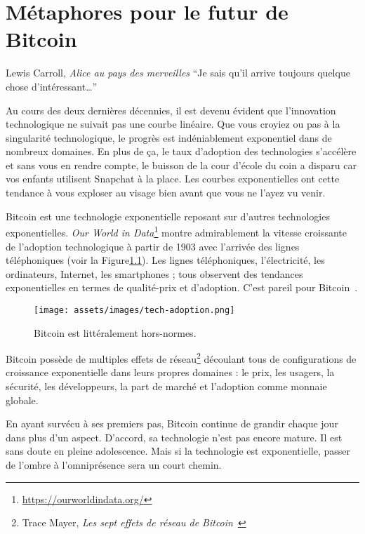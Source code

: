 \chapter{Métaphores pour le futur de Bitcoin}
\label{les:21}

\begin{chapquote}{Lewis Carroll, \textit{Alice au pays des merveilles}}
\enquote{Je sais qu’il arrive toujours quelque chose d’intéressant\ldots}
\end{chapquote}

Au cours des deux dernières décennies, il est devenu évident que l'innovation
technologique ne suivait pas une courbe linéaire. Que vous croyiez ou pas à la
singularité technologique, le progrès est indéniablement exponentiel dans de
nombreux domaines. En plus de ça, le taux d'adoption des technologies s'accélère
et sans vous en rendre compte, le buisson de la cour d'école du coin a disparu
car vos enfants utilisent Snapchat à la place. Les courbes exponentielles ont
cette tendance à vous exploser au visage bien avant que vous ne l'ayez vu venir.

Bitcoin est une technologie exponentielle reposant sur d'autres technologies
exponentielles. \textit{Our World in
Data}\footnote{\url{https://ourworldindata.org/}} montre admirablement la
vitesse croissante de l'adoption technologique à partir de 1903 avec l'arrivée
des lignes téléphoniques (voir la Figure\ref{fig:tech-adoption}). Les lignes
téléphoniques, l'électricité, les ordinateurs, Internet, les smartphones ; tous
observent des tendances exponentielles en termes de qualité-prix et d'adoption.
C'est pareil pour Bitcoin~\cite{tech-adoption}.

\begin{figure}
  \texttt{[image: assets/images/tech-adoption.png]}
  \caption{Bitcoin est littéralement hors-normes.}
  \label{fig:tech-adoption}
\end{figure}

Bitcoin possède de multiples effets de réseau\footnote{Trace Mayer, \textit{Les
sept effets de réseau de Bitcoin}~\cite{7-network-effects}} découlant tous de
configurations de croissance exponentielle dans leurs propres domaines : le
prix, les usagers, la sécurité, les développeurs, la part de marché et
l'adoption comme monnaie globale.

En ayant survécu à ses premiers pas, Bitcoin continue de grandir chaque jour
dans plus d'un aspect. D'accord, sa technologie n'est pas encore mature. Il est
sans doute en pleine adolescence. Mais si la technologie est exponentielle,
passer de l'ombre à l'omniprésence sera un court chemin.

